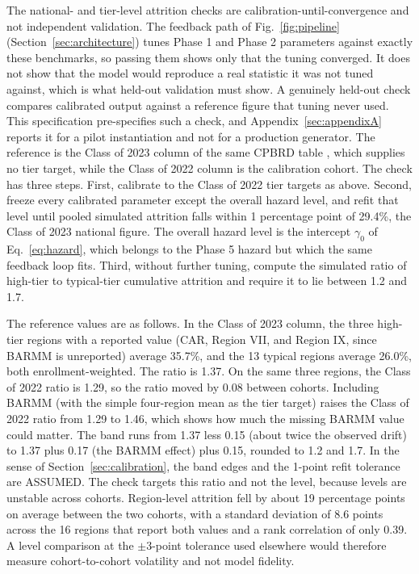 \documentclass[11pt]{article}
\begin{document}
The national- and tier-level attrition checks are calibration-until-convergence and not independent validation. The feedback path of Fig.~\ref{fig:pipeline} (Section~\ref{sec:architecture}) tunes Phase 1 and Phase 2 parameters against exactly these benchmarks, so passing them shows only that the tuning converged. It does not show that the model would reproduce a real statistic it was not tuned against, which is what held-out validation must show. A genuinely held-out check compares calibrated output against a reference figure that tuning never used. This specification pre-specifies such a check, and Appendix~\ref{sec:appendixA} reports it for a pilot instantiation and not for a production generator. The reference is the Class of 2023 column of the same CPBRD table \citep{cpbrd2026}, which supplies no tier target, while the Class of 2022 column is the calibration cohort. The check has three steps. First, calibrate to the Class of 2022 tier targets as above. Second, freeze every calibrated parameter except the overall hazard level, and refit that level until pooled simulated attrition falls within 1 percentage point of 29.4\%, the Class of 2023 national figure. The overall hazard level is the intercept $\gamma_0$ of Eq.~\ref{eq:hazard}, which belongs to the Phase 5 hazard but which the same feedback loop fits. Third, without further tuning, compute the simulated ratio of high-tier to typical-tier cumulative attrition and require it to lie between 1.2 and 1.7.

The reference values are as follows. In the Class of 2023 column, the three high-tier regions with a reported value (CAR, Region VII, and Region IX, since BARMM is unreported) average 35.7\%, and the 13 typical regions average 26.0\%, both enrollment-weighted. The ratio is 1.37. On the same three regions, the Class of 2022 ratio is 1.29, so the ratio moved by 0.08 between cohorts. Including BARMM (with the simple four-region mean as the tier target) raises the Class of 2022 ratio from 1.29 to 1.46, which shows how much the missing BARMM value could matter. The band runs from 1.37 less 0.15 (about twice the observed drift) to 1.37 plus 0.17 (the BARMM effect) plus 0.15, rounded to 1.2 and 1.7. In the sense of Section~\ref{sec:calibration}, the band edges and the 1-point refit tolerance are ASSUMED. The check targets this ratio and not the level, because levels are unstable across cohorts. Region-level attrition fell by about 19 percentage points on average between the two cohorts, with a standard deviation of 8.6 points across the 16 regions that report both values and a rank correlation of only 0.39. A level comparison at the $\pm$3-point tolerance used elsewhere would therefore measure cohort-to-cohort volatility and not model fidelity.
\end{document}
